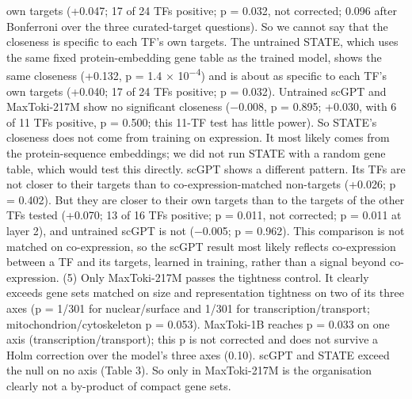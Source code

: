 \documentclass[
  11pt,
]{article}
\begin{document}
own targets (+0.047; 17 of 24 TFs positive; p = 0.032, not corrected;
0.096 after Bonferroni over the three curated-target questions). So we
cannot say that the closeness is specific to each TF's own targets. The
untrained STATE, which uses the same fixed protein-embedding gene table
as the trained model, shows the same closeness (+0.132, p = 1.4 ×
10\textsuperscript{−4}) and is about as specific to each TF's own
targets (+0.040; 17 of 24 TFs positive; p = 0.032). Untrained scGPT and
MaxToki-217M show no significant closeness (−0.008, p = 0.895; +0.030,
with 6 of 11 TFs positive, p = 0.500; this 11-TF test has little power).
So STATE's closeness does not come from training on expression. It most
likely comes from the protein-sequence embeddings; we did not run STATE
with a random gene table, which would test this directly. scGPT shows a
different pattern. Its TFs are not closer to their targets than to
co-expression-matched non-targets (+0.026; p = 0.402). But they are
closer to their own targets than to the targets of the other TFs tested
(+0.070; 13 of 16 TFs positive; p = 0.011, not corrected; p = 0.011 at
layer 2), and untrained scGPT is not (−0.005; p = 0.962). This
comparison is not matched on co-expression, so the scGPT result most
likely reflects co-expression between a TF and its targets, learned in
training, rather than a signal beyond co-expression. (5) Only
MaxToki-217M passes the tightness control. It clearly exceeds gene sets
matched on size and representation tightness on two of its three axes (p
= 1/301 for nuclear/surface and 1/301 for transcription/transport;
mitochondrion/cytoskeleton p = 0.053). MaxToki-1B reaches p = 0.033 on
one axis (transcription/transport); this p is not corrected and does not
survive a Holm correction over the model's three axes (0.10). scGPT and
STATE exceed the null on no axis (Table 3). So only in MaxToki-217M is
the organisation clearly not a by-product of compact gene sets.
\end{document}
